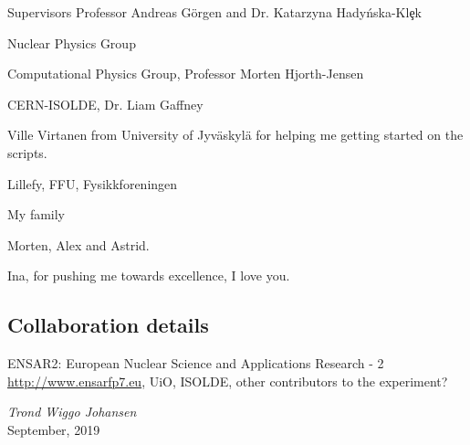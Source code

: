 \documentclass[twoside,english]{uiofysmaster/uiofysmaster}
\begin{document}
\begin{acknowledgements}
Supervisors Professor Andreas Görgen and Dr. Katarzyna Hady{\'{n}}ska-Kl{\c{e}}k

Nuclear Physics Group

Computational Physics Group, Professor Morten Hjorth-Jensen

CERN-ISOLDE, Dr. Liam Gaffney

Ville Virtanen from University of Jyväskylä for helping me getting started on the scripts. 

Lillefy, FFU, Fysikkforeningen

My family

Morten, Alex and Astrid.

Ina, for pushing me towards excellence, I love you.

\subsection*{Collaboration details}


ENSAR2: European Nuclear Science and Applications Research - 2 \url{http://www.ensarfp7.eu}, UiO, ISOLDE, other contributors to the experiment?



  \vspace{1.5cm}
  
  \noindent\textit{Trond Wiggo Johansen}\\
  
  \noindent September, 2019


\vspace{1cm}


\end{acknowledgements}
\end{document}
